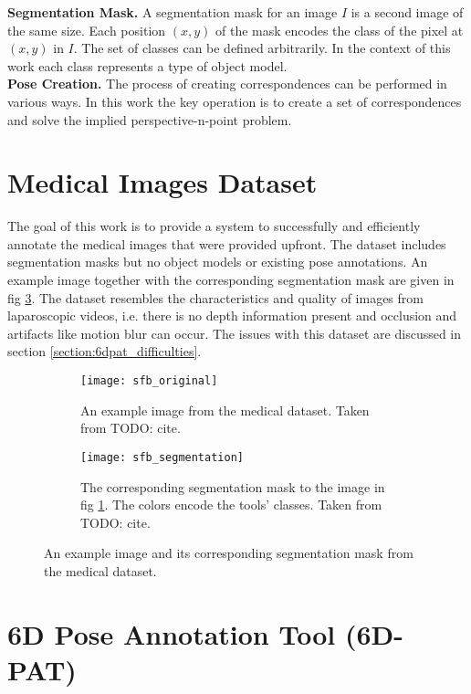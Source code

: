 \noindent\textbf{Segmentation Mask.} A segmentation mask for an image $I$ is a second image of the same size. Each position $(x, y)$ of the mask encodes the class of the pixel at $(x, y)$ in $I$. The set of classes can be defined arbitrarily. In the context of this work each class represents a type of object model. \\

\noindent\textbf{Pose Creation.} The process of creating correspondences can be performed in various ways. In this work the key operation is to create a set of correspondences and solve the implied perspective-n-point problem.

\section{Medical Images Dataset}

The goal of this work is to provide a system to successfully and efficiently annotate the medical images that were provided upfront. The dataset includes segmentation masks but no object models or existing pose annotations. An example image together with the corresponding segmentation mask are given in fig \ref{fig:sfb}. The dataset resembles the characteristics and quality of images from laparoscopic videos, i.e. there is no depth information present and occlusion and artifacts like motion blur can occur. The issues with this dataset are discussed in section \ref{section:6dpat_difficulties}. 

\begin{figure}[!tbp]
	\centering
	\begin{subfigure}[t]{0.47\textwidth}
	\centering
    	\texttt{[image: sfb\_original]}
    	\caption{An example image from the medical dataset. Taken from TODO: cite.}
    	\label{fig:sfb_original}
	\end{subfigure}
	\hfill
	\begin{subfigure}[t]{0.47\textwidth}
	\centering
    	\texttt{[image: sfb\_segmentation]}
    	\caption{The corresponding segmentation mask to the image in fig \ref{fig:sfb_original}. The colors encode the tools' classes. Taken from TODO: cite.}
    	\label{fig:sfb_segmentation}
	\end{subfigure}
	\caption{An example image and its corresponding segmentation mask from the medical dataset.}
	\label{fig:sfb}
\end{figure} 

\section{6D Pose Annotation Tool (6D-PAT)}

